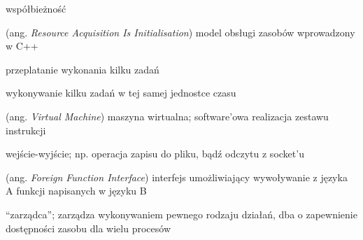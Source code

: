 \documentclass[11pt,oneside,a4paper,titlepage,onecolumn]{article}
\begin{document}
\begin{labeling}{współbieżność}
\item [RAII] (ang. \emph{Resource Acquisition Is Initialisation}) model obsługi zasobów wprowadzony w C++
\item [współbieżność] przeplatanie wykonania kilku zadań
\item [równoległość] wykonywanie kilku zadań w tej samej jednostce czasu
\item [VM] (ang. \emph{Virtual Machine}) maszyna wirtualna; software'owa realizacja zestawu instrukcji
\item [I/O] wejście-wyjście; np. operacja zapisu do pliku, bądź odczytu z socket'u
\item [FFI] (ang. \emph{Foreign Function Interface}) interfejs umożliwiający wywoływanie z języka A funkcji
    napisanych w języku B
\item [scheduler] ``zarządca''; zarządza wykonywaniem pewnego rodzaju działań, dba o zapewnienie dostępności
    zasobu dla wielu procesów
\end{labeling}
\end{document}
